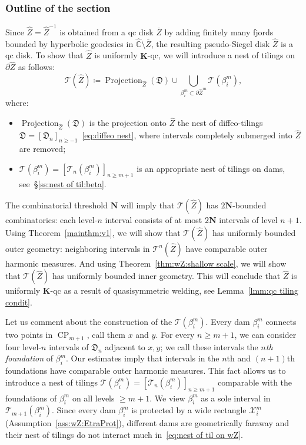 \documentclass{amsart}
\newcommand{\1}{{\mathbb 1 }}
\newcommand\TT{\mathcal{T}}
\newcommand\XX{\mathcal{X}}
\newcommand{\bN}{{\mathbf N}}
\newcommand{\wZ}{{\widehat Z}}
\newcommand{\bK}{{\mathbf K}}
\newcommand{\wC}{\widehat{\mathbb{C}}}
\newcommand{\Dbb}{{\mathfrak{D}}}
\theoremstyle{remark}
\numberwithin{equation}{section}
\theoremstyle{definition}
\newcommand{\CP}{{\operatorname{CP}}}
\begin{document}
\subsubsection{Outline of the section}
\label{sss:outline MotherHedg} Since $\wZ=\wZ^{-1}$ is obtained from a qc disk $\overline Z$ by adding finitely many fjords bounded by hyperbolic geodesics in $\wC\setminus \overline Z$, the resulting pseudo-Siegel disk $\wZ$ is a qc disk. To show that $\wZ$ is uniformly $\bK$-qc, we will introduce a nest of tilings on $\partial \wZ$ as follows:
\begin{equation}
\label{eq:nest of til on wZ}
\TT(\wZ)\coloneqq \operatorname{Projection}_{\wZ}(\Dbb)\cup \bigcup_{\beta^{m}_i\subset\partial \wZ^m} \TT(\beta^m_i),
\end{equation}
where:
\begin{itemize}
\item $\operatorname{Projection}_{\wZ}(\Dbb)$ is the projection onto $\wZ$ the nest of diffeo-tilings $\Dbb=[\Dbb_n]_{n\ge -1}$~\eqref{eq:diffeo nest}, where intervals completely submerged into $\wZ$ are removed;
\item $\TT(\beta^m_i)=[\TT_{n}(\beta^m_i)]_{n\ge m+1}$ is an appropriate nest of tilings on dams, see~\S\ref{ss:nest of til:beta}.  
\end{itemize}
 

The combinatorial threshold $\bN$ will imply that $\TT(\wZ)$ has $2\bN$-bounded combinatorics: each level-$n$ interval consists of at most $2\bN$ intervals of level $n+1$. Using Theorem~\ref{mainthm:v1}, we will show that  $\TT(\wZ)$ has uniformly bounded outer geometry: neighboring intervals in $\TT^n(\wZ)$ have comparable outer harmonic measures. And using Theorem~\ref{thm:wZ:shallow scale}, we will show that $\TT(\wZ)$ has uniformly bounded inner geometry. This will conclude that $\wZ$ is uniformly $\bK$-qc as a result of quasisymmetric welding, see  Lemma~\ref{lmm:qc tiling condit}. 

Let us comment about the construction of the $\TT(\beta^m_i)$. Every dam $\beta^m_i$ connects two points in $\CP_{m+1}$, call them $x$ and $y$. For every $n\ge m+1$, we can consider four level-$n$ intervals of $\Dbb_n$ adjacent to $x,y$; we call these intervals the \emph{$n$th foundation} of $\beta^m_i$. Our estimates imply that intervals in the $n$th and $(n+1)$th foundations have comparable outer harmonic measures. This fact allows us to introduce a nest of tilings $\TT(\beta^m_i)=[\TT_{n}(\beta^m_i)]_{n\ge m+1}$ comparable with the foundations of $\beta^m_i$ on all levels $\ge m+1$. We view $\beta^m_i$ as a sole interval in $\TT_{m+1}(\beta^m_i)$. Since every dam $\beta^m_i$ is protected by a wide rectangle $\XX^m_i$ (Assumption~\ref{ass:wZ:EtraProt}), different dams are geometrically faraway and their nest of tilings do not interact much in~\eqref{eq:nest of til on wZ}.
\end{document}
